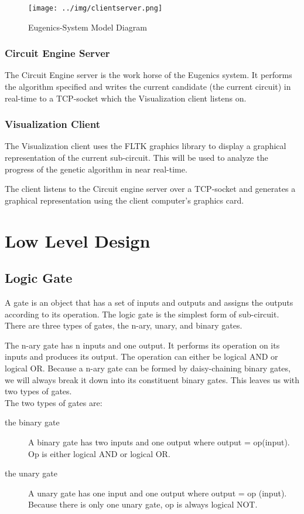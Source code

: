 \documentclass{article}
\begin{document}
\begin{figure}[hp]
\centering
\texttt{[image: ../img/clientserver.png]}
\caption{\label{fig:servclie}Eugenics-System Model Diagram}
\end{figure}

\subsubsection{Circuit Engine Server}
\label{sec-4-2-1}
The Circuit Engine server is the work horse of the Eugenics system. It performs
the algorithm specified and writes the current candidate (the current circuit)
in real-time to a TCP-socket which the Visualization client listens on.

\subsubsection{Visualization Client}
\label{sec-4-2-2}
The Visualization client uses the FLTK graphics library to display a graphical
representation of the current sub-circuit. This will be used to analyze the
progress of the genetic algorithm in near real-time.

The client listens to the Circuit engine server over a TCP-socket and generates
a graphical representation using the client computer's graphics card.

\section{Low Level Design}
\label{sec-5}

\subsection{Logic Gate}
\label{sec-5-1}
A gate is an object that has a set of inputs and outputs and assigns the outputs
according to its operation. The logic gate is the simplest form of sub-circuit.
There are three types of gates, the n-ary, unary, and binary gates.

The n-ary gate has n inputs and one output. It performs its operation on its
inputs and produces its output. The operation can either be logical AND or
logical OR. Because a n-ary gate can be formed by daisy-chaining binary gates,
we will always break it down into its constituent binary gates. This leaves us
with two types of gates. \\

The two types of gates are:
\begin{description}
\item[{the binary gate}] A binary gate has two inputs and one output where output = op(input). Op is
either logical AND or logical OR.
\item[{the unary gate}] A unary gate has one input and one output where output = op (input). Because
there is only one unary gate, op is always logical NOT.
\end{description}
\end{document}
